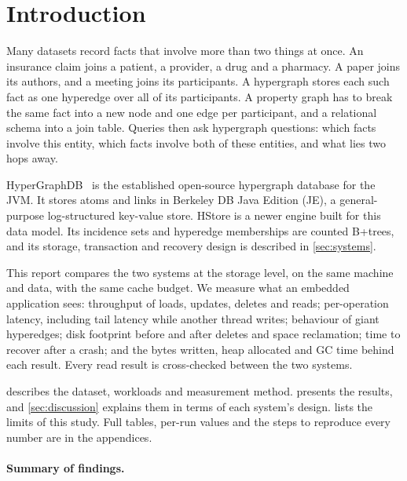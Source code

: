 \section{Introduction}

Many datasets record facts that involve more than two things at once. An insurance claim joins a patient, a provider, a drug and a pharmacy. A paper joins its authors, and a meeting joins its participants. A hypergraph stores each such fact as one hyperedge over all of its participants. A property graph has to break the same fact into a new node and one edge per participant, and a relational schema into a join table. Queries then ask hypergraph questions: which facts involve this entity, which facts involve both of these entities, and what lies two hops away.

HyperGraphDB~\cite{hgdb} is the established open-source hypergraph database for the JVM. It stores atoms and links in Berkeley DB Java Edition (JE), a general-purpose log-structured key-value store. HStore is a newer engine built for this data model. Its incidence sets and hyperedge memberships are counted B+trees, and its storage, transaction and recovery design is described in \cref{sec:systems}.

This report compares the two systems at the storage level, on the same machine and data, with the same cache budget. We measure what an embedded application sees: throughput of loads, updates, deletes and reads; per-operation latency, including tail latency while another thread writes; behaviour of giant hyperedges; disk footprint before and after deletes and space reclamation; time to recover after a crash; and the bytes written, heap allocated and GC time behind each result. Every read result is cross-checked between the two systems.

 describes the dataset, workloads and measurement method.  presents the results, and \cref{sec:discussion} explains them in terms of each system's design.  lists the limits of this study. Full tables, per-run values and the steps to reproduce every number are in the appendices.

\paragraph{Summary of findings.}

